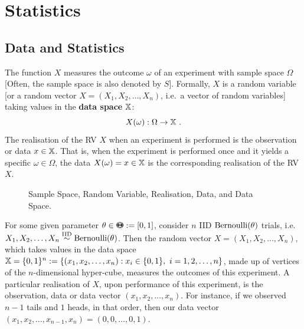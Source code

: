 \chapter{Statistics}\label{S:Statistics}

\section{Data and Statistics}\label{S:DataStats}

\begin{definition}[Data]
The function $X$ measures the outcome $\omega$ of an experiment with sample space $\Omega$ [Often, the sample space is also denoted by $S$].  Formally, $X$ is a random variable [or a random vector $X=(X_1,X_2,\ldots,X_n)$, i.e.~a vector of random variables] taking  values in the {\bf data space} $\mathbb{X}$:
\[
X(\omega):\Omega \to \mathbb{X} \ .
\]
The realisation of the RV $X$ when an experiment is performed is the observation or data $x \in \mathbb{X}$.  That is, when the experiment is performed once and it yields a specific $\omega \in \Omega$, the data $X(\omega)=x \in \mathbb{X}$ is the corresponding realisation of the RV $X$.
\end{definition}

\begin{figure}[htpb]
\caption{Sample Space, Random Variable, Realisation, Data, and Data Space.\label{F:Data}}
\vspace{2.5in}
\end{figure}

\begin{example}
For some given parameter $\theta \in {\Theta}\mspace{-11 mu}{\Theta} := [0,1]$, consider $n$ IID $\mbox{{\rm Bernoulli}}(\theta)$ trials, i.e.~$X_1,X_2,\ldots,X_n \overset{{\rm IID}}{\sim} \mbox{{\rm Bernoulli}}(\theta)$.  Then the random vector $X=(X_1,X_2,\ldots,X_n)$, which takes values in the data space $\mathbb{X} = \{0,1\}^n := \{ (x_1,x_2,\ldots,x_n) : x_i \in \{0,1\}, \ i=1,2,\ldots,n \}$, made up of vertices of the $n$-dimensional hyper-cube, measures the outcomes of this experiment.  A particular realisation of $X$, upon performance of this experiment, is the observation, data or data vector $(x_1,x_2,\ldots,x_n)$.  For instance, if we observed $n-1$ tails and $1$ heads, in that order, then our data vector $(x_1,x_2,\ldots,x_{n-1},x_n) = (0,0,\ldots,0,1)$.
\end{example}

